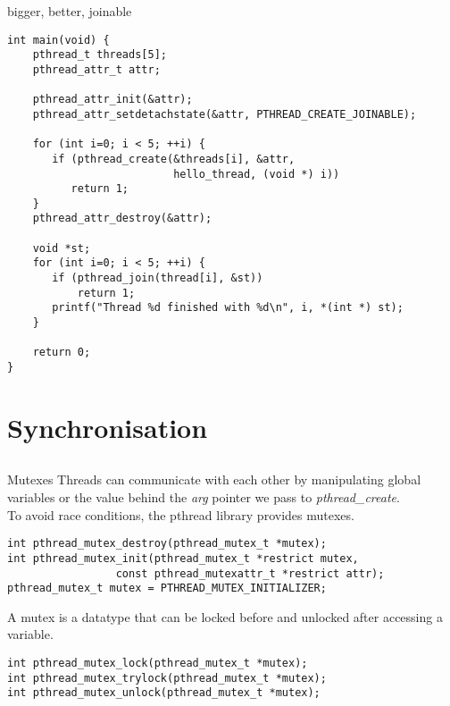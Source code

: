 \begin{frame}[fragile]{bigger, better, joinable}
    \begin{lstlisting}[basicstyle=\scriptsize]
int main(void) {
    pthread_t threads[5];
    pthread_attr_t attr;
    
    pthread_attr_init(&attr);
    pthread_attr_setdetachstate(&attr, PTHREAD_CREATE_JOINABLE);
    
    for (int i=0; i < 5; ++i) {
       if (pthread_create(&threads[i], &attr,
                          hello_thread, (void *) i))
          return 1;
    }
    pthread_attr_destroy(&attr);

    void *st;
    for (int i=0; i < 5; ++i) {
       if (pthread_join(thread[i], &st))
           return 1;
       printf("Thread %d finished with %d\n", i, *(int *) st);
    }
    
    return 0;
}
\end{lstlisting}
\end{frame}

\section{Synchronisation}
\subsection{}
\begin{frame}[fragile]{Mutexes}
    Threads can communicate with each other by manipulating global variables or the value behind the \textit{arg} pointer we pass to \textit{pthread\_create}.\\
    To avoid race conditions, the pthread library provides mutexes.
    \begin{lstlisting}[numbers=none]
int pthread_mutex_destroy(pthread_mutex_t *mutex);
int pthread_mutex_init(pthread_mutex_t *restrict mutex,
                 const pthread_mutexattr_t *restrict attr);
pthread_mutex_t mutex = PTHREAD_MUTEX_INITIALIZER;
\end{lstlisting}
    \bigskip
    A mutex is a datatype that can be locked before and unlocked after accessing a variable.
    \begin{lstlisting}[numbers=none]
int pthread_mutex_lock(pthread_mutex_t *mutex);
int pthread_mutex_trylock(pthread_mutex_t *mutex);
int pthread_mutex_unlock(pthread_mutex_t *mutex);
\end{lstlisting}
\end{frame}

